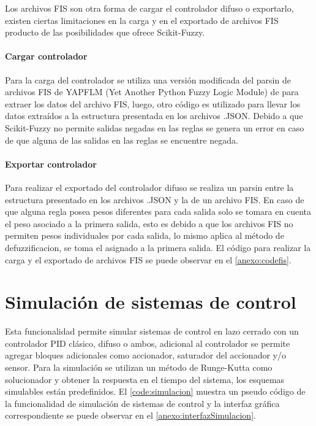             Los archivos FIS son otra forma de cargar el controlador difuso o exportarlo, existen ciertas limitaciones en la carga y en el exportado de archivos FIS producto de las posibilidades que ofrece Scikit-Fuzzy.

            \paragraph{Cargar controlador}
            
                 Para la carga del controlador se utiliza una versión modificada del parsin de archivos FIS de YAPFLM (Yet Another Python Fuzzy Logic Module) de \textcite{sputnick1124} para extraer los datos del archivo FIS, luego, otro código es utilizado para llevar los datos extraídos a la estructura presentada en los archivos .JSON. Debido a que Scikit-Fuzzy no permite salidas negadas en las reglas se genera un error en caso de que alguna de las salidas en las reglas se encuentre negada.
            
            \paragraph{Exportar controlador}

                Para realizar el exportado del controlador difuso se realiza un parsin entre la estructura presentado en los archivos .JSON y la de un archivo FIS. En caso de que alguna regla posea pesos diferentes para cada salida solo se tomara en cuenta el peso asociado a la primera salida, esto es debido a que los archivos FIS no permiten pesos individuales por cada salida, lo mismo aplica al método de defuzzificacion, se toma el asignado a la primera salida. El código para realizar la carga y el exportado de archivos FIS se puede observar en el \ref{anexo:codefis}.

\section{Simulación de sistemas de control}

    Esta funcionalidad permite simular sistemas de control en lazo cerrado con un controlador PID clásico, difuso o ambos, adicional al controlador se permite agregar bloques adicionales como accionador, saturador del accionador y/o sensor. Para la simulación se utilizan un método de Runge-Kutta como solucionador y obtener la respuesta en el tiempo del sistema, los esquemas simulables están predefinidos. El \cref{code:simulacion} muestra un pseudo código de la funcionalidad de simulación de sistemas de control y la interfaz gráfica correspondiente se puede observar en el \ref{anexo:interfazSimulacion}.

